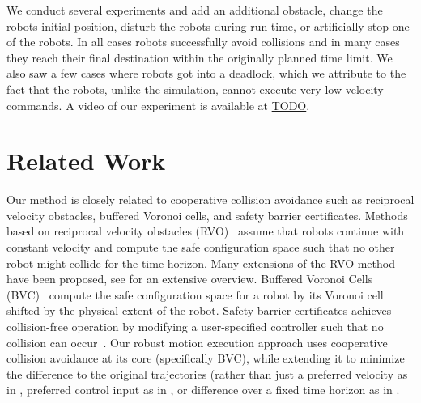\documentclass{svproc}
\newcommand{\todo}[1]{\textbf{\textcolor{red}{TODO: #1}}}
\begin{document}
We conduct several experiments and add an additional obstacle, change the robots initial position, disturb the robots during run-time, or artificially stop one of the robots.
In all cases robots successfully avoid collisions and in many cases they reach their final destination within the originally planned time limit.
We also saw a few cases where robots got into a deadlock, which we attribute to the fact that the robots, unlike the simulation, cannot execute very low velocity commands.
A video of our experiment is available at \url{TODO}.



\section{Related Work}
\label{sec:relatedWork}

Our method is closely related to cooperative collision avoidance such as reciprocal velocity obstacles, buffered Voronoi cells, and safety barrier certificates.
Methods based on reciprocal velocity obstacles (RVO)~\cite{RVO} assume that robots continue with constant velocity and compute the safe configuration space such that no other robot might collide for the time horizon.
Many extensions of the RVO method have been proposed, see \cite{epsilonCCA} for an extensive overview.
Buffered Voronoi Cells (BVC)~\cite{bufferedVoronoiCells} compute the safe configuration space for a robot by its Voronoi cell shifted by the physical extent of the robot. 
Safety barrier certificates achieves collision-free operation by modifying a user-specified controller such that no collision can occur~\cite{barrierCertificates}.
Our robust motion execution approach uses cooperative collision avoidance at its core (specifically BVC), while extending it to minimize the difference to the original trajectories (rather than just a preferred velocity as in \cite{epsilonCCA}, preferred control input as in \cite{barrierCertificates}, or difference over a fixed time horizon as in \cite{bufferedVoronoiCells}.
\end{document}
